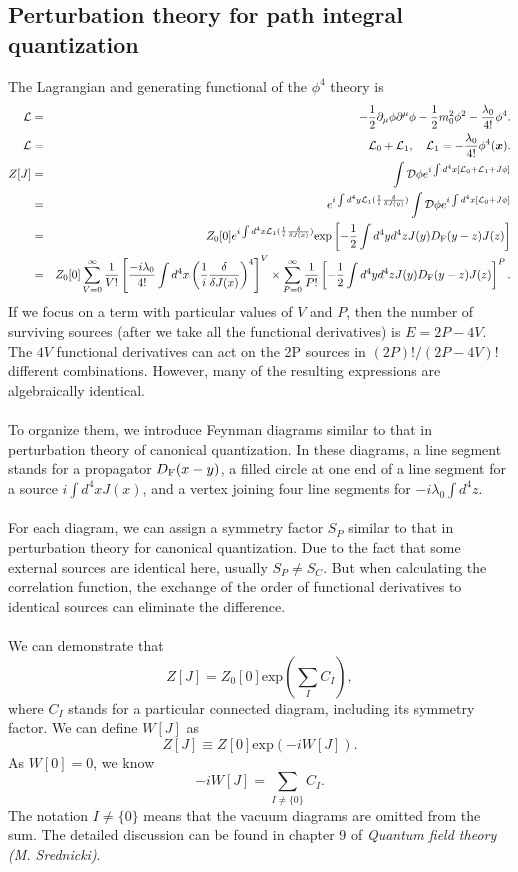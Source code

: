 \subsection{Perturbation theory for path integral quantization}
The Lagrangian and generating functional of the $\phi^4$ theory is
\begin{eqnarray}
\mathcal{L} &=& -\frac{1}{2}\partial_{\mu} \phi \partial^{\mu} \phi -\frac{1}{2}m_0^2 \phi^2 -\frac{\lambda_0}{4!}\phi^4 .\nonumber \\
\mathcal{L} &=& \mathcal{L}_0 + \mathcal{L}_1 , \quad \mathcal{L}_1 =- \frac{\lambda_0}{4!} \phi^4 (\bm{x}). \nonumber \\
Z[J] &=& \int \mathcal{D}\phi e^{i\int d^4x [\mathcal{L}_0 + \mathcal{L}_1 + J\phi]} \nonumber \\
&=& e^{i\int d^4y \mathcal{L}_1(\frac{1}{i} \frac{\delta}{\delta J(y)})} \int \mathcal{D}\phi e^{i\int d^4x [\mathcal{L}_0 + J\phi]} \nonumber \\
& = & Z_0[0]e^{i\int d^4x \mathcal{L}_1(\frac{1}{i} \frac{\delta}{\delta J(x)})} \mathrm{exp} \left[-\frac{1}{2} \int d^4y d^4z J(y)D_{\rm F}(y-z)J(z)\right] \nonumber \\
& =& Z_0[0]\sum_{V=0}^{\infty} \frac{1}{V!} \left[ \frac{-i\lambda_0}{4!} \int d^4x \left(\frac{1}{i} \frac{\delta}{\delta J(x)}\right)^4\right]^V \times \sum_{P=0}^{\infty} \frac{1}{P!} \left[-\frac{1}{2} \int d^4y d^4z J(y)D_{\rm F}(y-z)J(z)\right]^P .\nonumber
\end{eqnarray}
If we focus on a term with particular values of $V$ and $P$, then the number of surviving sources (after we take all the functional derivatives) is $E = 2P-4V$. The $4V$ functional derivatives can act on the 2P sources in ${(2P)!}/{(2P-4V)!}$ different combinations. However, many of the resulting expressions are algebraically identical.
\\ \\
To organize them, we introduce Feynman diagrams similar to that in perturbation theory of canonical quantization. In these diagrams, a line segment stands for a propagator $D_{\rm F}(x-y)$, a filled circle at one end of a line segment for a source $i\int d^4x J(x)$, and a vertex joining four line segments for $-i\lambda_0 \int d^4 z$.
\\ \\
For each diagram, we can assign a symmetry factor $S_P$ similar to that in perturbation theory for canonical quantization. Due to the fact that some external sources are identical here, usually $S_P \neq S_C$. But when calculating the correlation function, the exchange of the order of functional derivatives to identical sources can eliminate the difference.
\\ \\
We can demonstrate that
\[Z[J] = Z_0[0] \mathrm{exp}(\sum_I C_I),\]
where $C_I$ stands for a particular connected diagram, including its symmetry factor. We can define $W[J]$ as
\[Z[J] \equiv Z[0] \mathrm{exp}(-iW[J]).\]
As $W[0]=0$, we know
\[-iW[J] = \sum_{I \neq \{0\}} C_I.\]
The notation $I\neq \{0\}$ means that the vacuum diagrams are omitted from the sum.
The detailed discussion can be found in chapter 9 of \emph{Quantum field theory (M. Srednicki)}.

